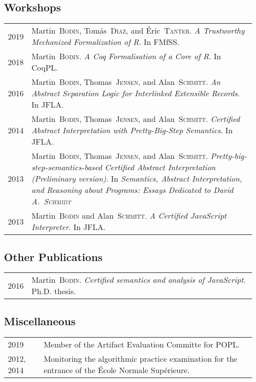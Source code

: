 \documentclass[12pt,a4paper]{article}
\makeatletter
\newcommand{\fr}[1]{\foreignlanguage{french}{{#1}}}
\newcommand{\fr}[1]{\foreignlanguage{francais}{{#1}}}
\newenvironment{datecvsection}[1]%
               {\subsection*{#1}%
                 \noindent \begin{tabular}{@{}p{\annee}p{\texte}@{}}}
               {\end{tabular}}
\newcommand\familyName{\textsc}
\newcommand\placeName{}
\makeatother
\begin{document}
\begin{datecvsection}{Workshops}

  2019 & Martin~\familyName{Bodin}, Tomás~\familyName{Diaz}, and Éric~\familyName{Tanter}. \textit{A Trustworthy Mechanized Formalization of R}. In FMfSS. \\

  2018 & Martin~\familyName{Bodin}. \textit{A Coq Formalisation of a Core of R}. In CoqPL. \\

  2016 & Martin~\familyName{Bodin}, Thomas~\familyName{Jensen}, and Alan~\familyName{Schmitt}. \textit{An Abstract Separation Logic for Interlinked Extensible Records}. In JFLA. \\

  2014 & Martin~\familyName{Bodin}, Thomas~\familyName{Jensen}, and Alan~\familyName{Schmitt}. \textit{Certified Abstract Interpretation with Pretty-Big-Step Semantics}. In JFLA. \\

  2013 & Martin~\familyName{Bodin}, Thomas~\familyName{Jensen}, and Alan~\familyName{Schmitt}. \textit{Pretty-big-step-semantics-based Certified Abstract Interpretation (Preliminary version)}. In \textit{Semantics, Abstract Interpretation, and Reasoning about Programs: Essays Dedicated to David A.~\familyName{Schmidt}} \\ %

  2013 & Martin~\familyName{Bodin} and Alan~\familyName{Schmitt}. \textit{A Certified JavaScript Interpreter}. In JFLA. \\

\end{datecvsection}

\begin{datecvsection}{Other Publications}

    2016 & Martin~\familyName{Bodin}. \textit{Certified semantics and analysis of JavaScript}. Ph.D. thesis. \\

\end{datecvsection}

\begin{datecvsection}{Miscellaneous}

    2019 & Member of the Artifact Evaluation Committe for POPL. \\

    2012, 2014 & Monitoring the algorithmic practice examination for the entrance of the \fr{\placeName{École Normale Supérieure}}. \\

\end{datecvsection}
\end{document}

